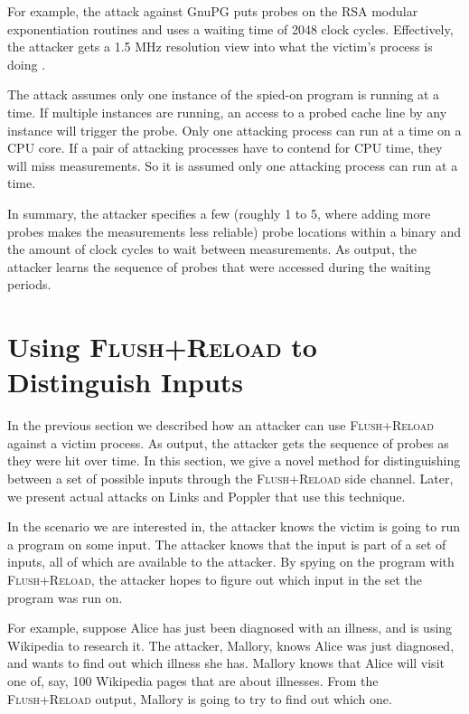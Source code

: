 \documentclass[letterpaper,twocolumn,10pt]{article}
\begin{document}
For example, the attack against GnuPG puts probes on the RSA modular
exponentiation routines and uses a waiting time of 2048 clock cycles.
Effectively, the attacker gets a 1.5 MHz resolution view into what the victim's
process is doing \cite{yarom2013flush}.

The attack assumes only one instance of the spied-on program is running at
a time. If multiple instances are running, an access to a probed cache line by
any instance will trigger the probe. Only one attacking process can run at
a time on a CPU core. If a pair of attacking processes have to contend for CPU
time, they will miss measurements. So it is assumed only one attacking process
can run at a time.

In summary, the attacker specifies a few (roughly 1 to 5, where adding more
probes makes the measurements less reliable) probe locations within a binary and
the amount of clock cycles to wait between measurements. As output, the attacker
learns the sequence of probes that were accessed during the waiting periods.

\section{Using \textsc{Flush+Reload} to Distinguish Inputs}

In the previous section we described how an attacker can use
\textsc{Flush+Reload} against a victim process. As output, the attacker gets the
sequence of probes as they were hit over time. In this section, we give a novel
method for distinguishing between a set of possible inputs through the
\textsc{Flush+Reload} side channel. Later, we present actual attacks on Links
and Poppler that use this technique.

In the scenario we are interested in, the attacker knows the victim is going to
run a program on some input. The attacker knows that the input is part of a set
of inputs, all of which are available to the attacker. By spying on the program
with \textsc{Flush+Reload}, the attacker hopes to figure out which input in the
set the program was run on.

For example, suppose Alice has just been diagnosed with an illness, and is using
Wikipedia to research it. The attacker, Mallory, knows Alice was just diagnosed,
and wants to find out which illness she has. Mallory knows that Alice will visit
one of, say, 100 Wikipedia pages that are about illnesses. From the
\textsc{Flush+Reload} output, Mallory is going to try to find out which one.
\end{document}
